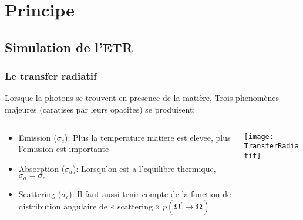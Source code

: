 
% 


\section{Principe}

\subsection{Simulation de l'ETR}

\begin{frame}
  \frametitle{Le transfer radiatif}

Lorsque la photons se trouvent en presence de la matière, Trois phenomènes majeures (caratises par leurs opacites) se produisent:

\begin{columns}
  \begin{column}{0.5\textwidth}
    \footnotesize
   \begin{itemize}
     \item Emission ($\sigma_e$): Plus la temperature matiere est elevee, plus l'emission est importante %
     \item Absorption ($\sigma_a$): Lorsqu'on est a l'equilibre thermique, $\sigma_a = \sigma_e$ %
     \item Scattering ($\sigma_c$): Il faut aussi tenir compte de la fonction de distribution angulaire de « scattering » $p(\bm{\Omega^\prime \rightarrow \bm{\Omega}})$.
   \end{itemize}
  \end{column}
  \begin{column}{0.5\textwidth}
     \begin{center}
      \texttt{[image: TransferRadiatif]}       
     \end{center}
  \end{column}
 \end{columns}
 
\end{frame}

